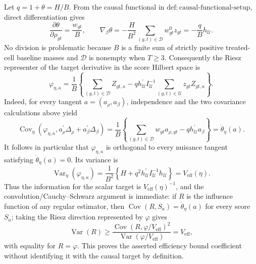 Let \(q=1+\theta=H/B\).  From the causal functional in
\(\mathrm{def{:}causal\text{-}functional\text{-}setup}\), direct
differentiation gives
\[
 \frac{\partial\theta}{\partial\rho_{gt}}=\frac{w_{gt}}{B},
 \qquad
 \nabla_{\beta}\theta
   =-\frac{H}{B^2}\sum_{(g,t)\in\mathcal D}w^0_{gt}z_{gt}
   =-\frac{q}{B}h_{\mathcal U}.
\]
No division is problematic because \(B\) is a finite sum of strictly
positive treated-cell baseline masses and \(\mathcal D\) is nonempty when
\(T\geq3\).  Consequently the Riesz representer of the target derivative in
the score Hilbert space is
\[
 \varphi_{\eta,\kappa}
 =\frac{1}{B}\left\{
      \sum_{(g,t)\in\mathcal D}Z_{gt,\kappa}
      -q h_{\mathcal U}^{\prime}I_{\mathcal U}^{-1}
          \sum_{(g,t)\in\mathcal U}z_{gt}Z_{gt,\kappa}
   \right\}.
\]
Indeed, for every tangent \(a=(a_{\rho},a_{\beta})\), independence and the
two covariance calculations above yield
\[
 \operatorname{Cov}_{\eta}\!\left(
   \varphi_{\eta,\kappa},
   a_{\rho}^{\prime}\Delta_{\rho}+a_{\beta}^{\prime}\Delta_{\beta}
 \right)
 =\frac{1}{B}\left\{
    \sum_{(g,t)\in\mathcal D}w_{gt}a_{\rho,gt}
       -q h_{\mathcal U}^{\prime}a_{\beta}
  \right\}
 =\dot\theta_{\eta}(a).
\]
It follows in particular that \(\varphi_{\eta,\kappa}\) is orthogonal to
every nuisance tangent satisfying \(\dot\theta_{\eta}(a)=0\).  Its variance
is
\[
 \operatorname{Var}_{\eta}(\varphi_{\eta,\kappa})
 =\frac{1}{B^2}\left\{
      H+q^2h_{\mathcal U}^{\prime}I_{\mathcal U}^{-1}h_{\mathcal U}
   \right\}
 =V_{\mathrm{eff}}(\eta).
\]
Thus the information for the scalar target is
\(V_{\mathrm{eff}}(\eta)^{-1}\), and the convolution/Cauchy--Schwarz
argument is immediate: if \(R\) is the influence function of any regular
estimator, then
\(\operatorname{Cov}(R,S_a)=\dot\theta_{\eta}(a)\) for every score
\(S_a\); taking the Riesz direction represented by \(\varphi\) gives
\[
 \operatorname{Var}(R)\geq
 \frac{\operatorname{Cov}(R,\varphi/V_{\mathrm{eff}})^2}
      {\operatorname{Var}(\varphi/V_{\mathrm{eff}})}
 =V_{\mathrm{eff}},
\]
with equality for \(R=\varphi\).  This proves the asserted efficiency
bound coefficient without identifying it with the causal target by
definition.

